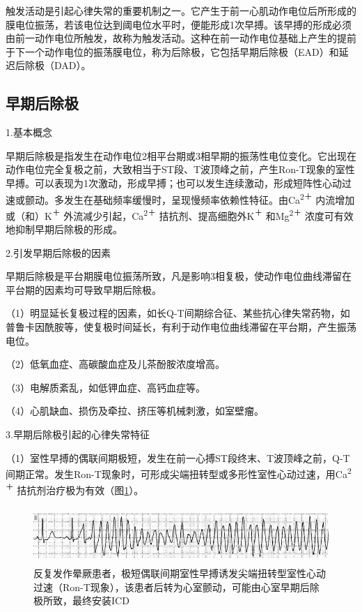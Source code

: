 触发活动是引起心律失常的重要机制之一。它产生于前一心肌动作电位后所形成的膜电位振荡，若该电位达到阈电位水平时，便能形成1次早搏。该早搏的形成必须由前一动作电位所触发，故称为触发活动。这种在前一动作电位基础上产生的提前于下一个动作电位的振荡膜电位，称为后除极，它包括早期后除极（EAD）和延迟后除极（DAD）。

\protect\hypertarget{text00024.htmlux5cux23subid303}{}{}

\subsection{早期后除极}

1.基本概念

早期后除极是指发生在动作电位2相平台期或3相早期的振荡性电位变化。它出现在动作电位完全复极之前，大致相当于ST段、T波顶峰之前，产生Ron-T现象的室性早搏。可以表现为1次激动，形成早搏；也可以发生连续激动，形成短阵性心动过速或颤动。多发生在基础频率缓慢时，呈现慢频率依赖性特征。由Ca\textsuperscript{2＋}
内流增加或（和）K\textsuperscript{＋}
外流减少引起，Ca\textsuperscript{2＋}
拮抗剂、提高细胞外K\textsuperscript{＋} 和Mg\textsuperscript{2＋}
浓度可有效地抑制早期后除极的形成。

2.引发早期后除极的因素

早期后除极是平台期膜电位振荡所致，凡是影响3相复极，使动作电位曲线滞留在平台期的因素均可导致早期后除极。

（1）明显延长复极过程的因素，如长Q-T间期综合征、某些抗心律失常药物，如普鲁卡因酰胺等，使复极时间延长，有利于动作电位曲线滞留在平台期，产生振荡电位。

（2）低氧血症、高碳酸血症及儿茶酚胺浓度增高。

（3）电解质紊乱，如低钾血症、高钙血症等。

（4）心肌缺血、损伤及牵拉、挤压等机械刺激，如室壁瘤。

3.早期后除极引起的心律失常特征

（1）室性早搏的偶联间期极短，发生在前一心搏ST段终末、T波顶峰之前，Q-T间期正常。发生Ron-T现象时，可形成尖端扭转型或多形性室性心动过速，用Ca\textsuperscript{2＋}
拮抗剂治疗极为有效（图\ref{fig17-1}）。

\begin{figure}[!htbp]
 \centering
 \includegraphics[width=5.53125in,height=0.84375in]{./images/Image00300.jpg}
 \captionsetup{justification=centering}
 \caption{反复发作晕厥患者，极短偶联间期室性早搏诱发尖端扭转型室性心动过速（Ron-T现象），该患者后转为心室颤动，可能由心室早期后除极所致，最终安装ICD}
 \label{fig17-1}
  \end{figure} 

